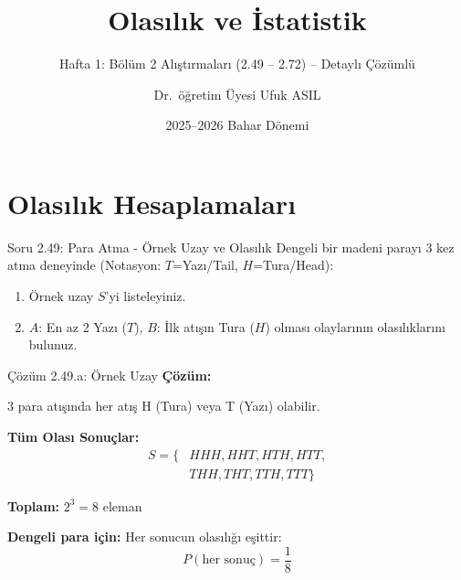 \documentclass[light]{lutbeamer}
\institute[Yazılım Mühendisliği]{YAZILIM MÜHENDİSLİĞİ BÖLÜMÜ}
\author{Dr.~öğretim Üyesi Ufuk ASIL}
\title{Olasılık ve İstatistik}
\subtitle{Hafta 1: Bölüm 2 Alıştırmaları (2.49 -- 2.72) -- Detaylı Çözümlü}
\date{2025--2026 Bahar Dönemi}
\begin{document}
\maketitle{}

\section{Olasılık Hesaplamaları}

\begin{frame}{Soru 2.49: Para Atma - Örnek Uzay ve Olasılık}
    Dengeli bir madeni parayı 3 kez atma deneyinde (Notasyon: $T$=Yazı/Tail, $H$=Tura/Head):
    \begin{enumerate}
        \item Örnek uzay $S$'yi listeleyiniz.
        \item $A$: En az 2 Yazı ($T$), $B$: İlk atışın Tura ($H$) olması olaylarının olasılıklarını bulunuz.
    \end{enumerate}
\end{frame}

\begin{frame}{Çözüm 2.49.a: Örnek Uzay}
    \color{blue}
    \textbf{Çözüm:}
    
    3 para atışında her atış H (Tura) veya T (Yazı) olabilir.
    
    \vspace{0.3cm}
    \textbf{Tüm Olası Sonuçlar:}
    \begin{align*}
    S = \{ &HHH, HHT, HTH, HTT, \\
           &THH, THT, TTH, TTT \}
    \end{align*}
    
    \textbf{Toplam:} $2^3 = 8$ eleman
    
    \vspace{0.3cm}
    \textbf{Dengeli para için:} Her sonucun olasılığı eşittir:
    \[ P(\text{her sonuç}) = \frac{1}{8} \]
\end{frame}
\end{document}
